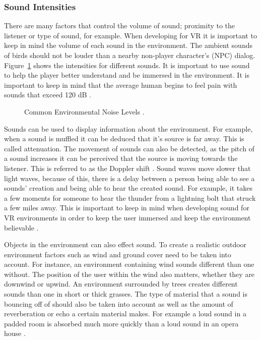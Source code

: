 \subsubsection{Sound Intensities}
There are many factors that control the volume of sound; proximity to the listener or type of sound, for example. When developing for VR it is important to keep in mind the volume of each sound in the environment. The ambient sounds of birds should not be louder than a nearby non-player character's (NPC) dialog. Figure~\ref{fig:soundVolume} shows the intensities for different sounds. It is important to use sound to help the player better understand and be immersed in the environment. It is important to keep in mind that the average human begins to feel pain with sounds that exceed 120 dB \cite{JIS2}. 
\begin{figure}[!ht]
	\begin{center}
	\end{center}
	\caption{Common Environmental Noise Levels \cite{JIS2}.} \label{fig:soundVolume}
\end{figure}


Sounds can be used to display information about the environment. For example, when a sound is muffled it can be deduced that it's source is far away. This is called attenuation. The movement of sounds can also be detected, as the pitch of a sound increases it can be perceived that the source is moving towards the listener. This is referred to as the Doppler shift \cite{JIS2}. Sound waves move slower that light waves, because of this, there is a delay between a person being able to see a sounds' creation and being able to hear the created sound. For example, it takes a few moments for someone to hear the thunder from a lightning bolt that struck a few miles away. This is important to keep in mind when developing sound for VR environments in order to keep the user immersed and keep the environment believable \cite{Madole1995}. 


Objects in the environment can also effect sound. To create a realistic outdoor environment factors such as wind and ground cover need to be taken into account. For instance, an environment containing wind sounds different than one without. The position of the user within the wind also matters, whether they are downwind or upwind. An environment surrounded by trees creates different sounds than one in short or thick grasses. The type of material that a sound is bouncing off of should also be taken into account as well as the amount of reverberation or echo a certain material makes. For example a loud sound in a padded room is absorbed much more quickly than a loud sound in an opera house \cite{Madole1995}.   


